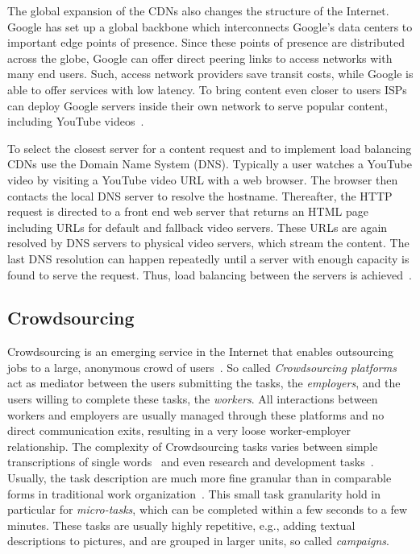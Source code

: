The global expansion of the CDNs also changes the structure of the Internet.
Google has set up a global backbone which interconnects Google's data centers to important edge points of presence.
Since these points of presence are distributed across the globe, Google can offer direct peering links to access networks with many end users.
Such, access network providers save transit costs, while Google is able to offer services with low latency.
To bring content even closer to users ISPs can deploy Google servers inside their own network to serve popular content, including YouTube videos~\cite{gcc}.

To select the closest server for a content request and to implement load balancing CDNs use the Domain Name System (DNS).
Typically a user watches a YouTube video by visiting a YouTube video URL with a web browser.
The browser then contacts the local DNS server to resolve the hostname.
Thereafter, the HTTP request is directed to a front end web server that returns an HTML page including URLs for default and fallback video servers.
These URLs are again resolved by DNS servers to physical video servers, which stream the content.
The last DNS resolution can happen repeatedly until a server with enough capacity is found to serve the request.
Thus, load balancing between the servers is achieved~\cite{adhikari2012vivisecting}.

\subsection{Crowdsourcing}
Crowdsourcing is an emerging service in the Internet that enables outsourcing jobs to a large, anonymous crowd of users~\cite{articles2013-113}.
So called \emph{Crowdsourcing platforms} act as mediator between the users submitting the tasks, the \emph{employers}, and the users willing to complete these tasks, the \emph{workers}.
All interactions between workers and employers are usually managed through these platforms and no direct communication exits, resulting in a very loose worker-employer relationship.
The complexity of Crowdsourcing tasks varies between simple transcriptions of single words~\cite{vonAhn2008} and even research and development tasks~\cite{innocentive}.
Usually, the task description are much more fine granular than in comparable forms in traditional work organization~\cite{conf2011-417}.
This small task granularity hold in particular for \emph{micro-tasks}, which can be completed within a few seconds to a few minutes.
These tasks are usually highly repetitive, e.g., adding textual descriptions to pictures, and are grouped in larger units, so called \emph{campaigns}.

